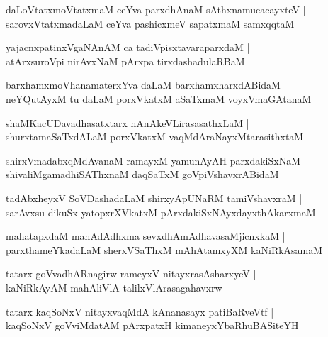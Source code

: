 \documentclass[twoside,12pt,openright]{book}
\newcounter{shloka}[chapter]
\begin{document}
\begin{shloka}%
daLoVtatxmoVtatxmaM ceYva parxdhAnaM sAthxnamucacayxteV |\\
sarovxVtatxmadaLaM ceYva pashicxmeV sapatxmaM samxqqtaM 
\end{shloka}

\begin{shloka}%
yajacnxpatinxVgaNAnAM ca tadiVpisxtavaraparxdaM |\\
atArxsuroVpi nirAvxNaM pArxpa  tirxdashadulaRBaM 
\end{shloka}

\begin{shloka}%
barxhamxmoVhanamaterxYva daLaM barxhamxharxdABidaM |\\
neYQutAyxM tu daLaM porxVkatxM aSaTxmaM voyxVmaGAtanaM 
\end{shloka}

\begin{shloka}%
shaMKacUDavadhasatxtarx nAnAkeVLirasasathxLaM |\\
shurxtamaSaTxdALaM porxVkatxM vaqMdAraNayxMtarasithxtaM 
\end{shloka}

\begin{shloka}%
shirxVmadabxqMdAvanaM ramayxM yamunAyAH parxdakiSxNaM |\\
shivaliMgamadhiSAThxnaM daqSaTxM goVpiVshavxrABidaM 
\end{shloka}

\begin{shloka}%
tadAbxheyxV SoVDashadaLaM shirxyApUNaRM tamiVshavxraM |\\
sarAvxsu dikuSx yatopxrXVkatxM pArxdakiSxNAyxdayxthAkarxmaM 
\end{shloka}

\begin{shloka}%
mahatapxdaM mahAdAdhxma sevxdhAmAdhavasaMjicnxkaM |\\
parxthameYkadaLaM sherxVSaThxM mAhAtamxyXM kaNiRkAsamaM  
\end{shloka}

\begin{shloka}%
tatarx goVvadhARnagirw rameyxV nitayxrasAsharxyeV |\\
kaNiRkAyAM mahAliVlA talilxVlArasagahavxrw 
\end{shloka}

\begin{shloka}%
tatarx kaqSoNxV nitayxvaqMdA kAnanasayx patiBaRveVtf |\\
kaqSoNxV goVviMdatAM pArxpatxH  kimaneyxYbaRhuBASiteYH
\end{shloka}
\end{document}
